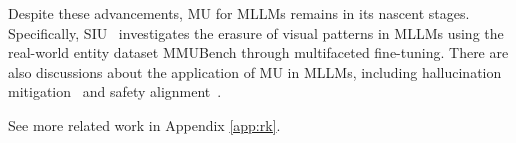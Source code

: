 Despite these advancements, MU for MLLMs remains in its nascent stages. Specifically, SIU~\cite{li2024siu} investigates the erasure of visual patterns in MLLMs using the real-world entity dataset MMUBench through multifaceted fine-tuning. There are also discussions about the application of MU in MLLMs, including hallucination mitigation~\cite{Xing2024EFUFEF} and safety alignment~\cite{Chakraborty2024CrossModalSA}.

See more related work in Appendix \ref{app:rk}.